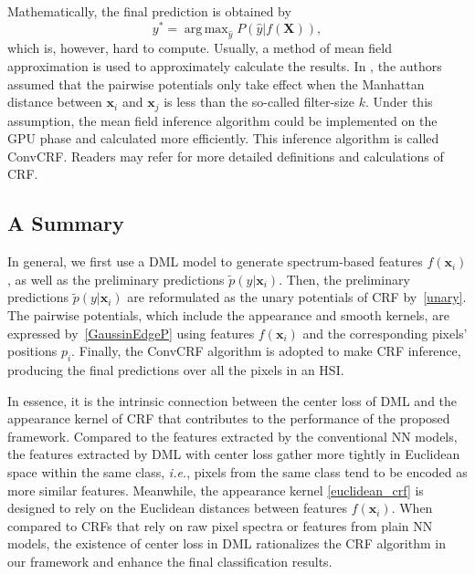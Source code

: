 \documentclass[]{article}
\DeclareMathOperator*{\argmax}{arg\,max}
\newcommand{\red}{\color{black}}
\newcommand{\magentaso}{\color{black}}
\begin{document}
Mathematically, the final prediction is obtained by
\begin{equation*}
	y^* = \argmax_{\hat{y}}P(\hat{y}|f(\mathbf{X})),
\end{equation*}
which is, however, hard to compute.
Usually, a method of mean field approximation \cite{krahenbuhl2011efficient} is used to 
approximately calculate the results.
In \cite{teichmann2018convolutional}, the authors assumed that the pairwise potentials
only take effect when the Manhattan distance between $\mathbf{x}_i$ and $\mathbf{x}_j$ is less than
the so-called filter-size $k$. Under this assumption, the mean field inference algorithm  
{\magentaso could be} implemented on the GPU phase and
calculated more efficiently. This inference algorithm is called
ConvCRF. Readers may refer \cite{krahenbuhl2011efficient, teichmann2018convolutional}
for more detailed definitions and calculations of CRF.

\subsection{\red A Summary}
{\red In general, we first use a DML model to generate spectrum-based features $f(\mathbf{x}_i)$, as well as
the preliminary predictions $\tilde{p}(y|\mathbf{x}_i)$. 
Then, {\magentaso the preliminary predictions $\tilde{p}(y|\mathbf{x}_i)$ are reformulated as the unary
potentials of CRF by~\eqref{unary}.} The pairwise potentials, which include the appearance and smooth kernels, 
are expressed by~\eqref{GaussinEdgeP} using features $f(\mathbf{x}_i)$ and 
{\red the corresponding pixels' positions $p_i$}.
Finally, the ConvCRF algorithm is adopted to make CRF inference, 
producing the final predictions {\magentaso over all the pixels in an HSI}.}

{\red In essence, it is the intrinsic connection between the center loss of DML and the appearance kernel {\magentaso of} CRF that contributes
to the performance of the proposed framework. Compared to the features extracted by the conventional NN models, 
the features extracted by DML with center loss gather more tightly
{\magentaso in Euclidean space within the same class}, {\em i.e.}, 
pixels from the same class tend to be encoded as more similar features.
Meanwhile, the appearance kernel \eqref{euclidean_crf} is designed to rely on 
the Euclidean distances between features $f(\mathbf{x}_i)$.}
When compared to CRFs that rely on raw pixel spectra or features from plain NN models,
the existence of center loss in DML {\magentaso rationalizes} the CRF algorithm in our 
framework and enhance the final classification results.
\end{document}
